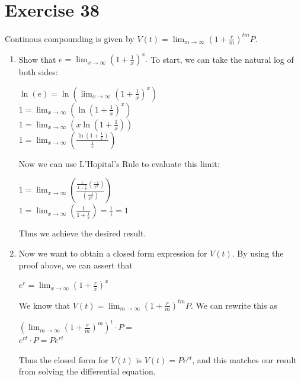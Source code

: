 \documentclass{article}
\begin{document}
\section*{Exercise 38}
Continous compounding is given by $V(t)=\lim_{m\rightarrow\infty}\left(1+\frac{r}{m}\right)^{tm}P.$
\begin{enumerate}
    \item Show that $e=\lim_{x\rightarrow\infty}\left(1+\frac{1}{x}\right)^x.$ To start, we can take the natural log of both sides:
        \begin{center}
            $\ln(e) = \ln(\lim_{x\rightarrow\infty}(1 + \frac{1}{x})^x)$ \\
            $1 = \lim_{x\rightarrow\infty}(\ln(1 + \frac{1}{x})^x)$ \\
            $1 = \lim_{x\rightarrow\infty}(x\ln(1 + \frac{1}{x}))$ \\
            $1 = \lim_{x\rightarrow\infty}\left( \frac{\ln(1 + \frac{1}{x})}{\frac{1}{x}}\right)$
        \end{center}
        Now we can use L'Hopital's Rule to evaluate this limit:
        \begin{center}
            $1 = \lim_{x\rightarrow\infty}\left( \frac{\frac{1}{1 + \frac{1}{x}} (\frac{-1}{x^2})}{(\frac{-1}{x^2})} \right)$ \\
            $1 = \lim_{x\rightarrow\infty}(\frac{1}{1 + \frac{1}{x}}) = \frac{1}{1} = 1$
        \end{center}
        Thus we achieve the desired result.
    \item Now we want to obtain a closed form expression for $V(t)$. By using the proof above, we can assert that
        \begin{center}
            $e^r = \lim_{x\rightarrow\infty}(1 + \frac{r}{x})^x$
        \end{center}
        We know that $V(t)=\displaystyle \lim_{m\rightarrow\infty}\left(1+\frac{r}{m}\right)^{tm}P$. We can rewrite this as
        \begin{center}
            $\left( \lim_{m\rightarrow\infty} (1 + \frac{r}{m})^m \right)^t \cdot P = $ \\
            $e^{rt} \cdot P = Pe^{rt}$
        \end{center}
        Thus the closed form for $V(t)$ is $V(t) = Pe^{rt}$, and this matches our result from solving the differential equation.
\end{enumerate}
\end{document}
